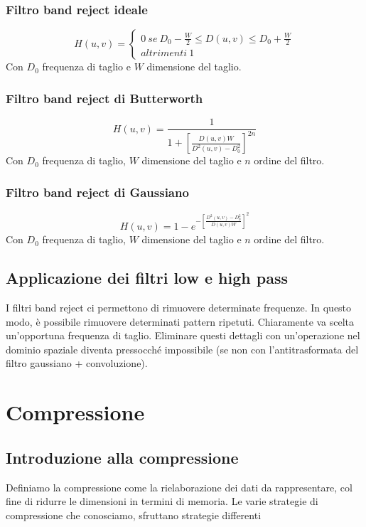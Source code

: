 \documentclass{report}
\begin{document}
	\subsection{Filtro band reject ideale}
	$$
	H(u,v) = \begin{cases}
	0 \ se \ D_0 - \frac{W}{2}\leq D(u,v) \leq D_0 + \frac{W}{2}\\
	altrimenti \ 1
	\end{cases}
	$$
	Con $D_0$ frequenza di taglio e $W$ dimensione del taglio.
	\subsection{Filtro band reject di Butterworth}
	$$
	H(u,v) = \frac{1}{1+\left[ \frac{D(u,v)W}{D^2(u,v)-D_0^2}\right]^{2n}}
	$$
	Con $D_0$ frequenza di taglio, $W$ dimensione del taglio e $n$ ordine del filtro.
	\subsection{Filtro band reject di Gaussiano}
	$$
	H(u,v) = 1-e^{-\left[ \frac{D^2(u,v)-D^2_0}{D(u,v)W}\right]^2}
	$$
	Con $D_0$ frequenza di taglio, $W$ dimensione del taglio e $n$ ordine del filtro.
	\section{Applicazione dei filtri low e high pass}
	I filtri band reject ci permettono di rimuovere determinate frequenze. In questo modo, è possibile rimuovere determinati pattern ripetuti. Chiaramente va scelta un'opportuna frequenza di taglio. Eliminare questi dettagli con un'operazione nel dominio spaziale diventa pressocché impossibile (se non con l'antitrasformata del filtro gaussiano + convoluzione).
		
	\chapter{Compressione}
	\section{Introduzione alla compressione}
	Definiamo la compressione come la rielaborazione dei dati da rappresentare, col fine di ridurre le dimensioni in termini di memoria. Le varie strategie di compressione che conosciamo, sfruttano strategie differenti
\end{document}
